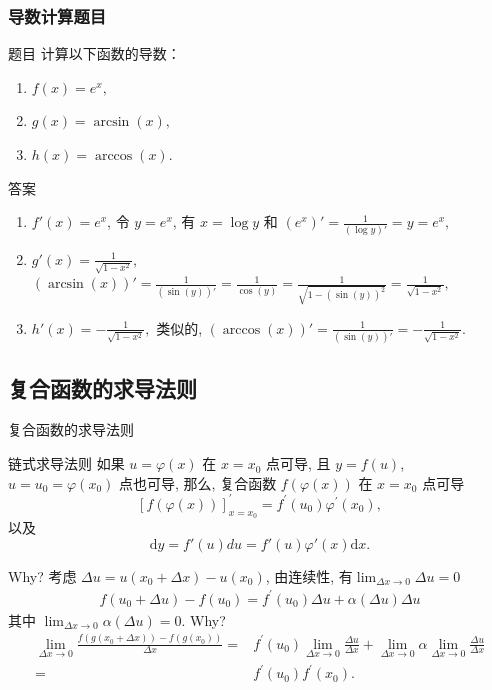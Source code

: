 \documentclass[
10pt,
aspectratio=43,
]{beamer}
\begin{document}
\begin{frame}
	\frametitle{导数计算题目}
	\begin{exampleblock}{题目}
		计算以下函数的导数：
		\begin{enumerate}
			\item $f(x) = e^x,$
			\item $g(x) = \arcsin(x),$
			\item $h(x) = \arccos(x).$
		\end{enumerate}
	\end{exampleblock}

	\pause

	\begin{exampleblock}{答案}
		\begin{enumerate}
			\item $f'(x) = e^x$, 令 $y=e^x$, 有 $x=\log y$ 和 $(e^x)'=\displaystyle\frac{1}{(\log y)'}=y=e^x,$
			\item $g'(x) = \displaystyle\frac{1}{\sqrt{1-x^2}},$ $(\arcsin(x))'=\displaystyle\frac{1}{(\sin (y))'}=\frac{1}{\cos(y)}=\frac{1}{\sqrt{1-(\sin(y))^2}}=\frac{1}{\sqrt{1-x^2}},$
			\item $h'(x) = -\displaystyle\frac{1}{\sqrt{1-x^2}},$ 类似的, $(\arccos(x))'=\displaystyle\frac{1}{(\sin (y))'}=-\frac{1}{\sqrt{1-x^2}}.$
		\end{enumerate}
	\end{exampleblock}
\end{frame}


\subsection{复合函数的求导法则}
\begin{frame}{复合函数的求导法则}
	\begin{block}{链式求导法则}
		如果 $u=\varphi(x)$ 在 $x=x_0$ 点可导, 且 $y=f(u)$, $u=u_0=\varphi\left(x_0\right)$ 点也可导, 那么, 复合函数 $f(\varphi(x))$ 在 $x=x_0$ 点可导
		\[
			[f(\varphi(x))]_{x=x_0}^{\prime}=f^{\prime}\left(u_0\right) \varphi^{\prime}\left(x_0\right),
		\]
		以及
		\[
			\mathrm{d}y=f'(u)du=f'(u)\varphi'(x)\mathrm{d}x.
		\]
	\end{block}
	Why? \pause 考虑 $\Delta u = u(x_0+\Delta x) - u(x_0)$, \pause 由连续性, 有$\lim_{\Delta x\to0}\Delta u=0$ \pause
	\begin{align*}
		f\left(u_0+\Delta u\right)-f\left(u_0\right)=f^{\prime}\left(u_0\right) \Delta u+\alpha(\Delta u) \Delta u
	\end{align*}
	其中 $\lim_{\Delta x\to0}\alpha(\Delta u)=0$. \pause Why? \pause
	\begin{align*}
		\lim _{\Delta x \rightarrow 0} \frac{f\left(g\left(x_0+\Delta x\right)\right)-f\left(g\left(x_0\right)\right)}{\Delta x}= & f^{\prime}\left(u_0\right) \lim _{\Delta x \rightarrow 0} \frac{\Delta u}{\Delta x}+\lim _{\Delta x \rightarrow 0} \alpha \lim _{\Delta x \rightarrow 0} \frac{\Delta u}{\Delta x} \\
		=                                                                                                                         & f^{\prime}\left(u_0\right)f^{\prime}\left(x_0\right).
	\end{align*}
\end{frame}
\end{document}
